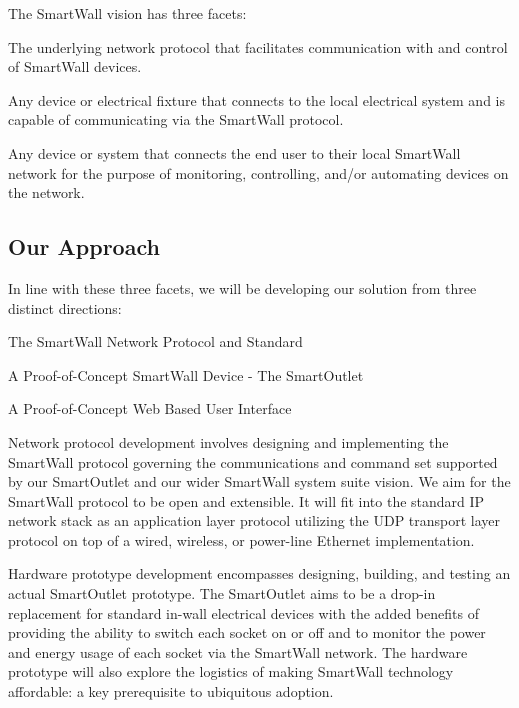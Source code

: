 \documentclass[11pt]{article}
\begin{document}
The SmartWall vision has three facets:
\begin{description}
  \setlength{\itemsep}{0pt}
  \setlength{\parskip}{0pt}
  \setlength{\parsep}{0pt}
\item[SmartWall Protocol:] The underlying network protocol that
  facilitates communication with and control of SmartWall devices.
\item[SmartWall Enabled Devices:] Any device or electrical fixture that
  connects to the local electrical system and is capable of
  communicating via the SmartWall protocol.
\item[SmartWall User Interfaces:] Any device or system that connects
  the end user to their local SmartWall network for the purpose of
  monitoring, controlling, and/or automating devices on the network.
\end{description}

\subsection{Our Approach}
In line with these three facets, we will be  developing our solution
from three distinct directions:
\begin{description}
  \setlength{\itemsep}{0pt}
  \setlength{\parskip}{0pt}
  \setlength{\parsep}{0pt}
\item[Network:] The SmartWall Network Protocol and Standard
\item[Hardware:] A Proof-of-Concept SmartWall Device - The SmartOutlet
\item[User Interface:] A Proof-of-Concept Web Based User Interface 
\end{description}

Network protocol development involves designing and implementing the
SmartWall protocol governing the communications and command set supported
by our SmartOutlet and our wider SmartWall system suite
vision. We aim for the SmartWall protocol to be open and
extensible. It will fit into the standard IP network stack as an application
layer protocol utilizing the UDP transport layer protocol on top of a
wired, wireless, or power-line Ethernet implementation.

Hardware prototype development encompasses designing,
building, and testing an actual SmartOutlet prototype. The SmartOutlet
aims to be a drop-in replacement for standard in-wall electrical
devices with the added benefits of providing the ability to switch
each socket on or off and
to monitor the power and energy usage of each socket via the SmartWall
network. The hardware prototype will also explore the logistics of
making SmartWall technology affordable: a key prerequisite to ubiquitous
adoption.
\end{document}
